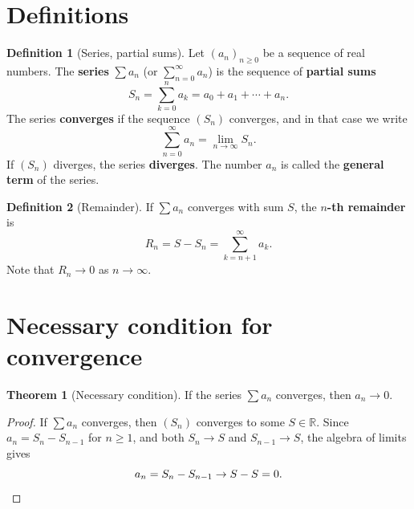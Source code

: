 \documentclass[12pt,a4paper,openany]{book}
\newcommand{\R}{\mathbb{R}}
\theoremstyle{definition}
\newtheorem{definition}{Definition}[chapter]
\newtheorem{theorem}{Theorem}[chapter]
\theoremstyle{remark}
\begin{document}
\section{Definitions}\label{sec:series-def}

\begin{definition}[Series, partial sums]\label{def:series}
Let $(a_n)_{n\geq 0}$ be a sequence of real numbers. The \textbf{series}
$\displaystyle\sum a_n$ (or $\sum_{n=0}^{\infty} a_n$) is the sequence of
\textbf{partial sums}
\[
   S_n = \sum_{k=0}^{n} a_k = a_0 + a_1 + \cdots + a_n.
\]
The series \textbf{converges} if the sequence
$(S_n)$ converges, and in that case we write
\[
   \sum_{n=0}^{\infty} a_n = \lim_{n\to\infty} S_n.
\]
If $(S_n)$ diverges, the series \textbf{diverges}.
The number $a_n$ is called the \textbf{general term} of the series.
\end{definition}

\begin{definition}[Remainder]\label{def:remainder}
If $\sum a_n$ converges with sum $S$, the \textbf{$n$-th remainder} is
\[
   R_n = S - S_n = \sum_{k=n+1}^{\infty} a_k.
\]
Note that $R_n \to 0$ as $n \to \infty$.
\end{definition}

\section{Necessary condition for convergence}\label{sec:necessary-cond}

\begin{theorem}[Necessary condition]\label{thm:necessary}
If the series $\sum a_n$ converges, then $a_n \to 0$.
\end{theorem}

\begin{proof}
If $\sum a_n$ converges, then $(S_n)$ converges to some $S \in \R$. Since
$a_n = S_n - S_{n-1}$ for $n \geq 1$, and both $S_n \to S$ and $S_{n-1} \to S$,
the algebra of limits gives
\[
   a_n = S_n - S_{n-1} \to S - S = 0. \qedhere
\]
\end{proof}
\end{document}
